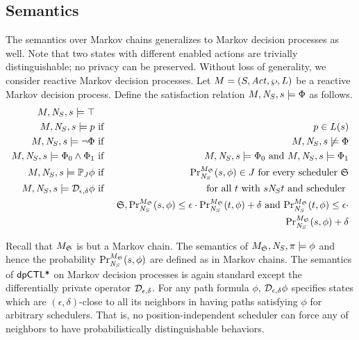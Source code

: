 \subsection{Semantics}
The semantics over Markov chains generalizes to Markov decision
processes as well. Note that two states with different enabled actions
are trivially distinguishable; no privacy can be preserved. Without
loss of generality, we consider reactive Markov decision processes.
Let $M = (S, \Act, \wp, L)$ be a reactive Markov
decision process. Define the satisfaction
relation $M, \neighbor{S}, s \models \Phi$ as follows.
\begin{eqnarray*}
  M, \neighbor{S}, s \models \top\\
  M, \neighbor{S}, s \models p
  & \textmd{ if } &
  p \in L(s)\\
  M, \neighbor{S}, s \models \neg \Phi
  & \textmd{ if } &
  M, \neighbor{S}, s \not\models \Phi\\
  M, \neighbor{S}, s \models \Phi_0 \wedge \Phi_1
  & \textmd{ if } &
  M, \neighbor{S}, s \models \Phi_0 \textmd{ and }
  M, \neighbor{S}, s \models \Phi_1\\
  M, \neighbor{S}, s \models \PJ{J} \phi
  & \textmd{ if } &
  \myPr{s}{M_{\scheduler{S}}}{\neighbor{S}}{\phi} \in J
  \textmd{ for every scheduler } \scheduler{S}\\
  M, \neighbor{S}, s \models \dpriv{\epsilon}{\delta} \phi
  & \textmd{ if } &
  \textmd{for all } t \textmd{ with } s \neighbor{S} t \textmd{ and
   scheduler } \\
  & & \scheduler{S},
   \myPr{s}{M_{\scheduler{S}}}{\neighbor{S}}{\phi} \leq \epsilon \cdot
   \myPr{t}{M_{\scheduler{S}}}{\neighbor{S}}{\phi} + \delta
   \textmd{ and }
   \myPr{t}{M_{\scheduler{S}}}{\neighbor{S}}{\phi} \leq \epsilon \cdot
  \\
  & &
   \myPr{s}{M_{\scheduler{S}}}{\neighbor{S}}{\phi} + \delta
\end{eqnarray*}

Recall that $M_{\scheduler{S}}$ is but a Markov chain. The semantics
of $M_{\scheduler{S}}, \neighbor{S}, \pi \models \phi$ and hence the
probability $\myPr{s}{M_{\scheduler{S}}}{\neighbor{S}}{\phi}$ are
defined as in Markov chains.
The semantics of $\dpCTLstar$ on Markov decision processes
is again standard except the differentially private operator
$\dpriv{\epsilon}{\delta}$. For any path formula $\phi$,
$\dpriv{\epsilon}{\delta} \phi$ specifies states which are $(\epsilon,
\delta)$-close to all its neighbors in having paths satisfying $\phi$
for arbitrary schedulers. That is, no
position-independent scheduler can force any of neighbors to have
probabilistically distinguishable behaviors.

